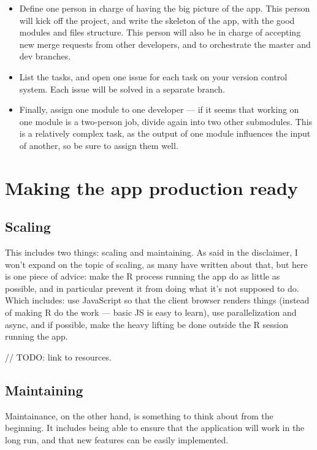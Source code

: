 \documentclass[]{book}
\providecommand{\tightlist}{%
  \setlength{\itemsep}{0pt}\setlength{\parskip}{0pt}}
\begin{document}
\begin{itemize}
\tightlist
\item
  Define one person in charge of having the big picture of the app. This person will kick off the project, and write the skeleton of the app, with the good modules and files structure. This person will also be in charge of accepting new merge requests from other developers, and to orchestrate the master and dev branches.
\item
  List the tasks, and open one issue for each task on your version control system. Each issue will be solved in a separate branch.
\item
  Finally, assign one module to one developer --- if it seems that working on one module is a two-person job, divide again into two other submodules. This is a relatively complex task, as the output of one module influences the input of another, so be sure to assign them well.
\end{itemize}

\hypertarget{making-the-app-production-ready}{%
\section{Making the app production ready}\label{making-the-app-production-ready}}

\hypertarget{scaling}{%
\subsection{Scaling}\label{scaling}}

This includes two things: scaling and maintaining. As said in the disclaimer, I won't expand on the topic of scaling, as many have written about that, but here is one piece of advice: make the R process running the app do as little as possible, and in particular prevent it from doing what it's not supposed to do. Which includes: use JavaScript so that the client browser renders things (instead of making R do the work --- basic JS is easy to learn), use parallelization and async, and if possible, make the heavy lifting be done outside the R session running the app.

// TODO: link to resources.

\hypertarget{maintaining}{%
\subsection{Maintaining}\label{maintaining}}

Maintainance, on the other hand, is something to think about from the beginning. It includes being able to ensure that the application will work in the long run, and that new features can be easily implemented.
\end{document}
